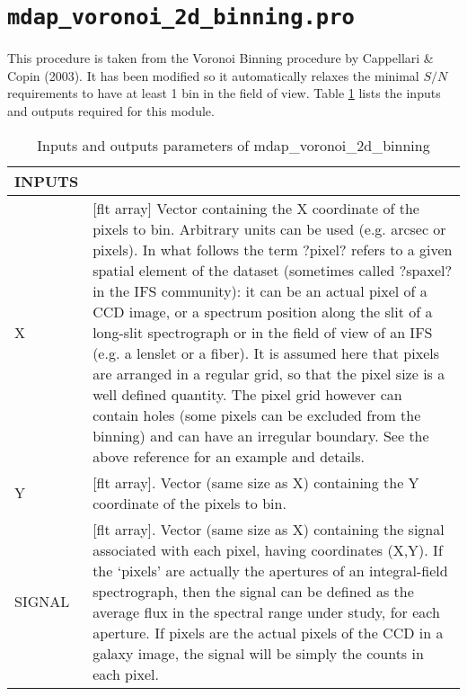 \section{{\tt mdap\_voronoi\_2d\_binning.pro}}
\label{dap_sec:mdap_voronoi_2d_binning}

This procedure is taken from the Voronoi Binning procedure by
Cappellari \& Copin (2003).  It has been modified so it automatically
relaxes the minimal $S/N$ requirements to have at least 1 bin in the
field of view. Table \ref{dap_tab:mdap_voronoi_2d_binning} lists the
inputs and outputs required for this module.


\begin{center}
\begin{longtable}{p{2.7cm}| p{11.1cm}}
\caption{Inputs and outputs parameters of mdap\_voronoi\_2d\_binning} \label{dap_tab:mdap_voronoi_2d_binning} \\
\hline
\endfirsthead
\hline
\endhead
\hline
\endlastfoot
\hline
{\bf  INPUTS} &  \\
\hline
X &[flt array] Vector containing the X coordinate of the pixels to bin.
             Arbitrary units can be used (e.g. arcsec or pixels).
            In what follows the term ?pixel? refers to a given
            spatial element of the dataset (sometimes called ?spaxel? in
            the IFS community): it can be an actual pixel of a CCD
            image, or a spectrum position along the slit of a long-slit
            spectrograph or in the field of view of an IFS
            (e.g. a lenslet or a fiber).
            It is assumed here that pixels are arranged in a regular
            grid, so that the pixel size is a well defined quantity.
            The pixel grid however can contain holes (some pixels can be
            excluded from the binning) and can have an irregular boundary.
            See the above reference for an example and details.\\
%
Y  &[flt array]. Vector (same size as X) containing the Y coordinate
            of the pixels to bin.\\
%
SIGNAL  &[flt array]. Vector (same size as X) containing the signal
            associated with each pixel, having coordinates (X,Y).
            If the `pixels' are actually the apertures of an
            integral-field spectrograph, then the signal can be
            defined as the average flux in the spectral range under
            study, for each aperture.
            If pixels are the actual pixels of the CCD in a galaxy
            image, the signal will be simply the counts in each pixel.\\

\end{longtable}
\end{center}
